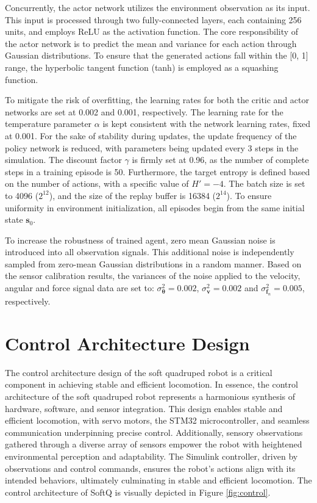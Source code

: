Concurrently, the actor network utilizes the environment observation as its input. This input is processed through two fully-connected layers, each containing 256 units, and employs ReLU as the activation function. The core responsibility of the actor network is to predict the mean and variance for each action through Gaussian distributions. To ensure that the generated actions fall within the [0, 1] range, the hyperbolic tangent function (tanh) is employed as a squashing function. 

To mitigate the risk of overfitting, the learning rates for both the critic and actor networks are set at 0.002 and 0.001, respectively. The learning rate for the temperature parameter $\alpha$ is kept consistent with the network learning rates, fixed at 0.001. For the sake of stability during updates, the update frequency of the policy network is reduced, with parameters being updated every 3 steps in the simulation. The discount factor $\gamma$ is firmly set at 0.96, as the number of complete steps in a training episode is 50. Furthermore, the target entropy is defined based on the number of actions, with a specific value of $H'=-4$. The batch size is set to 4096 ($2^{12}$), and the size of the replay buffer is 16384 ($2^{14}$). To ensure uniformity in environment initialization, all episodes begin from the same initial state $\mathbf{s}_0$.

To increase the robustness of trained agent, zero mean Gaussian noise is introduced into all observation signals. This additional noise is independently sampled from zero-mean Gaussian distributions in a random manner. Based on the sensor calibration results, the variances of the noise applied to the velocity, angular and force signal data are set to: $\sigma_{\pmb{\theta}}^2 = 0.002$, $\sigma_{\mathbf{v}}^2 = 0.002$ and $\sigma_{\mathbf{f}_n}^2 = 0.005$, respectively.

\section{Control Architecture Design}
The control architecture design of the soft quadruped robot is a critical component in achieving stable and efficient locomotion. In essence, the control architecture of the soft quadruped robot represents a harmonious synthesis of hardware, software, and sensor integration. This design enables stable and efficient locomotion, with servo motors, the STM32 microcontroller, and seamless communication underpinning precise control. Additionally, sensory observations gathered through a diverse array of sensors empower the robot with heightened environmental perception and adaptability. The Simulink controller, driven by observations and control commands, ensures the robot's actions align with its intended behaviors, ultimately culminating in stable and efficient locomotion. The control architecture of SoftQ is visually depicted in Figure \ref{fig:control}.


